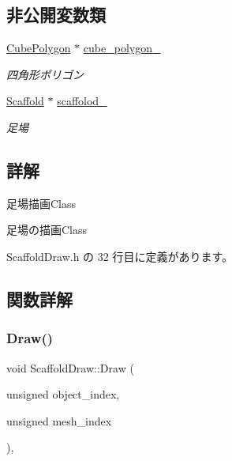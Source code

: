 \subsection*{非公開変数類}
\begin{DoxyCompactItemize}
\item 
\mbox{\hyperlink{class_cube_polygon}{Cube\+Polygon}} $\ast$ \mbox{\hyperlink{class_scaffold_draw_a2296ab71298cdd4e8600c6c513e31390}{cube\+\_\+polygon\+\_\+}}
\begin{DoxyCompactList}\small\item\em 四角形ポリゴン \end{DoxyCompactList}\item 
\mbox{\hyperlink{class_scaffold}{Scaffold}} $\ast$ \mbox{\hyperlink{class_scaffold_draw_a3d77a9d774e193f9e5eede0c1f352006}{scaffolod\+\_\+}}
\begin{DoxyCompactList}\small\item\em 足場 \end{DoxyCompactList}\end{DoxyCompactItemize}


\subsection{詳解}
足場描画\+Class 

足場の描画\+Class 

 Scaffold\+Draw.\+h の 32 行目に定義があります。



\subsection{関数詳解}
\mbox{\label{class_scaffold_draw_ae70204344a061ff43744a116da64b013}} 
\subsubsection{\texorpdfstring{Draw()}{Draw()}}
{\footnotesize\ttfamily void Scaffold\+Draw\+::\+Draw (\begin{DoxyParamCaption}\item[{unsigned}]{object\+\_\+index,  }\item[{unsigned}]{mesh\+\_\+index }\end{DoxyParamCaption})\hspace{0.3cm}{\ttfamily [override]}, {\ttfamily [virtual]}}



